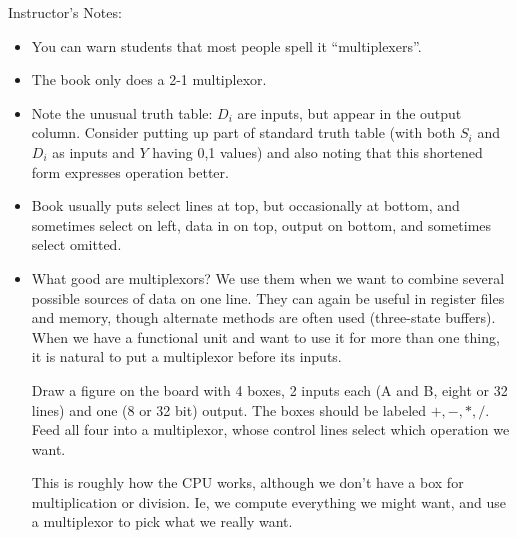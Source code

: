 \BNotes\ifnum{}
\begin{frame}[fragile]
Instructor's Notes:
\begin{itemize}
\item You can warn students that most people spell it
``multiplexers''.
\item The book only does a 2-1 multiplexor.
\item Note the unusual truth table: $D_i$ are inputs, but appear in the
	output column.  Consider putting up part of standard truth table
	(with both $S_i$ and $D_i$ as inputs and $Y$ having 0,1 values)
	and also noting that this shortened form expresses operation
	better.
\item Book usually puts select lines at top, but occasionally at bottom,
	and sometimes select on left, data in on top, output on
	bottom, and sometimes select omitted.

 \item What good are multiplexors? We use them when we want to combine
several possible sources of data on one line.  They can again be useful
in register files and memory, though alternate methods are often
used (three-state buffers). When we have a functional unit and want to
use it for more than one thing, it is natural to put a multiplexor
before its inputs.

Draw a figure on the board with 4 boxes, 2 inputs each (A and B, eight
	or 32 lines) and one (8 or 32 bit) output.  The boxes should be
	labeled $+,-,*,/$.  Feed all four into a multiplexor, whose
	control lines select which operation we want.  

	This is roughly how the CPU works, although we don't have a box
	for multiplication or division.  Ie, we compute everything we
	might want, and use a multiplexor to pick what we really want.

\end{itemize}
\end{frame}
\fi\ENotes

